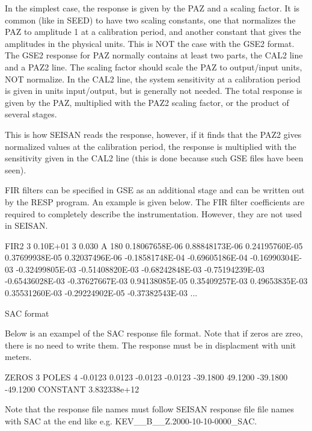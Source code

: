 In the simplest case, the response is given by the PAZ and a scaling factor. It is common (like in SEED) to have two scaling constants, one that normalizes the PAZ to amplitude 1 at a calibration period, and another constant that gives the amplitudes in the physical units. This is NOT the case with the GSE2 format. The GSE2 response for PAZ normally contains at least two parts, the CAL2 line and a PAZ2 line. The scaling factor should scale the PAZ to output/input units, NOT normalize. In the CAL2 line, the system sensitivity at a calibration period is given in units input/output, but is generally not needed. The total response is given by the PAZ, multiplied with the PAZ2 scaling factor, or the product of several stages. 

This is how SEISAN reads the response, however, if it finds that the PAZ2 gives normalized values at the calibration period, the response is multiplied with the sensitivity given in the CAL2 line (this is done because such GSE files have been seen). 

FIR filters can be specified in GSE as an additional stage and can be written out by the RESP program. An example is given below. The FIR filter coefficients are required to completely describe the instrumentation. However, they are not used in SEISAN. 

FIR2 3 0.10E+01 3 0.030 A 180 \newline
0.18067658E-06 0.88848173E-06 0.24195760E-05  0.37699938E-05 0.32037496E-06 \newline
 -0.18581748E-04 -0.69605186E-04 -0.16990304E-03 -0.32499805E-03 -0.51408820E-03 \newline
 -0.68242848E-03 -0.75194239E-03 -0.65436028E-03 -0.37627667E-03  0.94138085E-05 \newline
0.35409257E-03 0.49653835E-03 0.35531260E-03 -0.29224902E-05 -0.37382543E-03 \newline
...


SAC format

Below is an exampel of the SAC response file format. Note that if zeros are zreo, there is no need to write them. The response must be in displacment with unit meters.

ZEROS 3
POLES 4
-0.0123  0.0123
-0.0123  -0.0123
-39.1800  49.1200
-39.1800  -49.1200
CONSTANT 3.832338e+12


Note that the response file names must follow SEISAN response file file names  with SAC at the end like e.g. KEV\_\_B\_\_Z.2000-10-10-0000\_SAC. 
